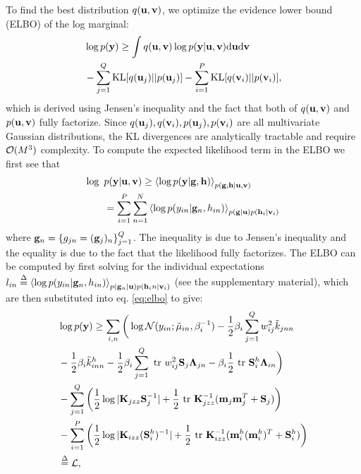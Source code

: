 \noindent
To find the best distribution $q(\mathbf{u}, \mathbf{v})$, we  optimize the evidence lower bound (ELBO) of the log marginal:
\begin{align}
\nonumber
&\log p(\mathbf{y}) \ge \int q(\mathbf{u}, \mathbf{v}) \log p(\mathbf{y} | \mathbf{u}, \mathbf{v})  \mathrm{d} \mathbf{u} \mathrm{d} \mathbf{v} \\
&- \sum_{j=1}^Q \text{KL}[q(\mathbf{u}_j) || p(\mathbf{u}_j)] - \sum_{i=1}^P \text{KL}[q(\mathbf{v}_i) || p(\mathbf{v}_i)],
\label{eq:elbo}
\end{align}
which is derived using Jensen's inequality and the fact that both of $q(\mathbf{u}, \mathbf{v})$ and $p(\mathbf{u}, \mathbf{v})$ fully factorize.
Since $q(\mathbf{u}_j), q(\mathbf{v}_i), p(\mathbf{u}_j), p(\mathbf{v}_i)$ are all multivariate Gaussian distributions, the KL divergences are analytically tractable and require $\mathcal{O}(M^3)$ complexity. To compute the expected likelihood term in the ELBO we first see that
\begin{align}
\nonumber
\log \text{ } &p(\mathbf{y} | \mathbf{u}, \mathbf{v})
\ge \left\langle \log p(\mathbf{y} | \mathbf{g}, \mathbf{h}) \right\rangle_{p(\mathbf{g},\mathbf{h} | \mathbf{u}, \mathbf{v})}  \\
&= \sum_{i=1}^P \sum_{n=1}^N \left\langle \log p(y_{in} | \mathbf{g}_n, h_{in})  \right\rangle_{p(\mathbf{g} | \mathbf{u}) p(\mathbf{h}_i | \mathbf{v}_i)} 
\end{align}
where $\mathbf{g}_n = \{g_{jn} = (\mathbf{g}_j)_n\}_{j=1}^Q$.
The inequality is due to Jensen's inequality and the equality is due to the fact that the likelihood fully factorizes.
\newcommand{\Ahi}{\A^h_i}
\newcommand{\Zi}{\Z_i}
The ELBO can be computed by first solving for the individual expectations 
$l_{in} \overset{\Delta}{=} \left\langle \log p(y_{in} | \mathbf{g}_n, h_{in})  \right\rangle_{p(\mathbf{g}_n | \mathbf{u}) p(\mathbf{h}_in | \mathbf{v}_i)}$ (see the supplementary material), which are then substituted into eq. \ref{eq:elbo} to give:
\begin{align}
\nonumber
&\log p(\mathbf{y})
\ge \sum_{i,n}
\bigg( \log  \mathcal{N}(y_{in}; \tilde{\mu}_{in}, \beta_i^{-1})
          - \frac{1}{2} \beta_i \sum_{j=1}^Q w_{ij}^2 \tilde{k}_{jnn} \\ \nonumber
         &- \frac{1}{2} \beta_i \tilde{k}^h_{inn}
         - \frac{1}{2} \beta_i \sum_{j=1}^Q \mbox{ \rm tr } w_{ij}^2 \mathbf{S}_j \mathbf{\Lambda}_{jn} - \beta_i \frac{1}{2} \mbox{ \rm tr } \mathbf{S}^h_i \mathbf{\Lambda}_{in} 
\bigg) \\
\nonumber
& - \sum_{j=1}^Q \bigg( \frac{1}{2} \log |\mathbf{K}_{jzz} \mathbf{S}_j^{-1}| + \frac{1}{2} \mbox{ \rm tr } \mathbf{K}_{jzz}^{-1}  (\mathbf{m}_j \mathbf{m}_j^T + \mathbf{S}_j)\bigg) \\
\nonumber
& - \sum_{i=1}^P  \bigg( \frac{1}{2} \log |\mathbf{K}_{izz}(\mathbf{S}^h_i)^{-1}| + \frac{1}{2} \mbox{ \rm tr } \mathbf{K}_{izz}^{-1} (\mathbf{m}^h_i (\mathbf{m}^h_i)^T + \mathbf{S}^h_i) \bigg) \\
  &\overset{\Delta}{=} \mathcal{L},
  \label{eq:L}
\end{align}
